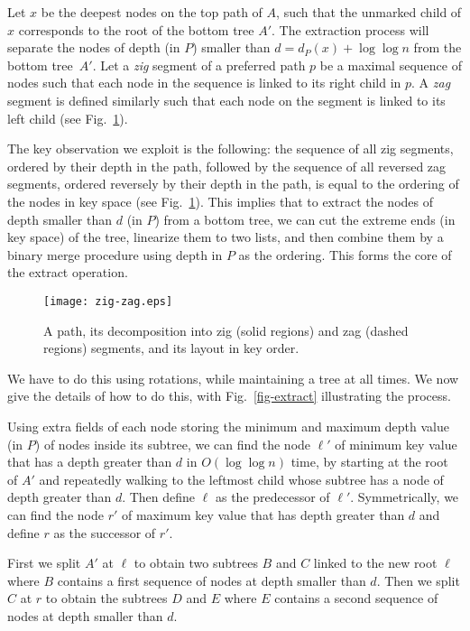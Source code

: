 \documentclass[letterpaper,11pt]{article}
\newcommand{\toppath}{top path}
\newcommand{\bottomtree}{bottom tree}
\newcounter{todo}
\newcommand{\todo}[1]{}
\begin{document}
Let $x$ be the deepest nodes on the \toppath{} of $A$, such that the
unmarked child of $x$ corresponds to the root of the \bottomtree{}
$A'$. The extraction process will separate the nodes of depth (in $P$)
smaller than $d=d_P(x)+\log \log n$ from the \bottomtree{}~$A'$.
Let a \emph{zig} segment of a preferred path $p$ be a maximal sequence of
nodes such that each node in the sequence is linked to its right child in
$p$. A \emph{zag} segment is defined similarly such that each node on the
segment is linked to its left child (see Fig.~\ref{fig-zig-zag}).

The key observation we exploit is the following: the sequence of all zig
segments, ordered by their depth in the path, followed by the sequence of
all reversed zag segments, ordered reversely by their depth in the path, is
equal to the ordering of the nodes in key space (see
Fig.~\ref{fig-zig-zag}).
This implies that to extract the nodes of depth smaller than $d$ (in $P$)
from a \bottomtree{}, we can cut the extreme ends (in key space) of the
tree, linearize them to two lists, and then combine them by a binary merge
procedure using depth in $P$ as the ordering. This forms the core of the
extract operation.

\begin{figure}\begin{center}
        \texttt{[image: zig-zag.eps]}
    \end{center}
    \caption{\label{fig-zig-zag} A path, its decomposition into zig (solid
    regions) and zag (dashed regions) segments, and its layout in key order.}
\end{figure}

We have to do this using rotations, while maintaining a tree at all
times. We now give the details of how to do this, with
Fig.~\ref{fig-extract} illustrating the process.

Using extra fields of each node storing the minimum and maximum depth value
(in $P$) of nodes inside its subtree, we can find the node $\ell'$ of
minimum key value that has a depth greater than $d$ in $O(\log \log n)$
time, by starting at the root of $A'$ and repeatedly walking to the
leftmost child whose subtree has a node of depth greater than $d$. Then
define $\ell$ as the predecessor of $\ell'$. Symmetrically, we can find the
node $r'$ of maximum key value that has depth greater than $d$ and define
$r$ as the successor of $r'$.

First we \todo{Operation split should be introduced properly, with BST
formulation. Probably in tango section. Rolf.} split $A'$ at $\ell$ to
obtain two subtrees $B$ and $C$ linked to the new root $\ell$ where $B$
contains a first sequence of nodes at depth smaller than $d$. Then we split
$C$ at $r$ to obtain the subtrees $D$ and $E$ where $E$ contains a second
sequence of nodes at depth smaller than $d$.
\end{document}
